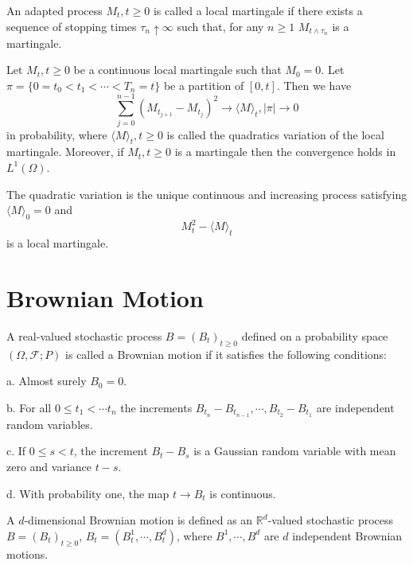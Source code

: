 \documentclass[lang=en, color=blue, ]{elegantbook}
\newcommand{\F}{\mathcal{F}}
\newcommand{\R}{\mathbb{R}}
\begin{document}
\begin{definition}
    An adapted process $M_t,t\geq 0$ is called a local martingale if there exists a sequence of stopping times $\tau_n\uparrow \infty$ such that, for any $n\geq 1$ $M_{t\wedge\tau_n}$ is a martingale.
\end{definition}

\begin{theorem}
    Let $M_t,t\geq 0$ be a continuous local martingale such that $M_0 = 0$. Let $\pi = \{0= t_0 < t_1<\cdots<T_n = t\}$ be a partition of $[0,t]$. Then we have
    \[\sum\limits_{j=0}^{n-1}(M_{t_{j+1}}-M_{t_j})^2 \to \langle M\rangle_t, |\pi| \to 0\]
    in probability, where $\langle M\rangle_t, t\geq 0$ is called the quadratics variation of the local martingale. Moreover, if $M_t, t\geq 0$ is a martingale then the convergence holds in $L^1(\Omega)$.
\end{theorem}

\begin{theorem}
    The quadratic variation is the unique continuous and increasing process satisfying $\langle M\rangle_0 = 0$ and
    \[M_t^2 - \langle M\rangle_t\] is a local martingale.\par
\end{theorem}



\section{Brownian Motion}

\begin{definition}
A real-valued stochastic process $B=(B_t)_{t\geq 0}$ defined on a probability space $(\Omega,\F;P)$ is called a Brownian motion if it satisfies the following conditions:\par
a. Almost surely $B_0 = 0$.\par
b. For all $0\leq t_1 < \cdots t_n$ the increments $B_{t_n}-B_{t_{n-1}},\cdots,B_{t_2}-B_{t_1}$ are independent random variables.\par
c. If $0\leq s < t$, the increment $B_t-B_s$ is a Gaussian random variable with mean zero and variance $t-s$.\par
d. With probability one, the map $t\to B_t$ is continuous.\par
A $d$-dimensional Brownian motion is defined as an $\R^d$-valued stochastic process $B=(B_t)_{t\geq 0}$, $B_t = (B_t^1,\cdots,B_t^d)$, where $B^1,\cdots,B^d$ are $d$ independent Brownian motions.
\end{definition}
\end{document}

